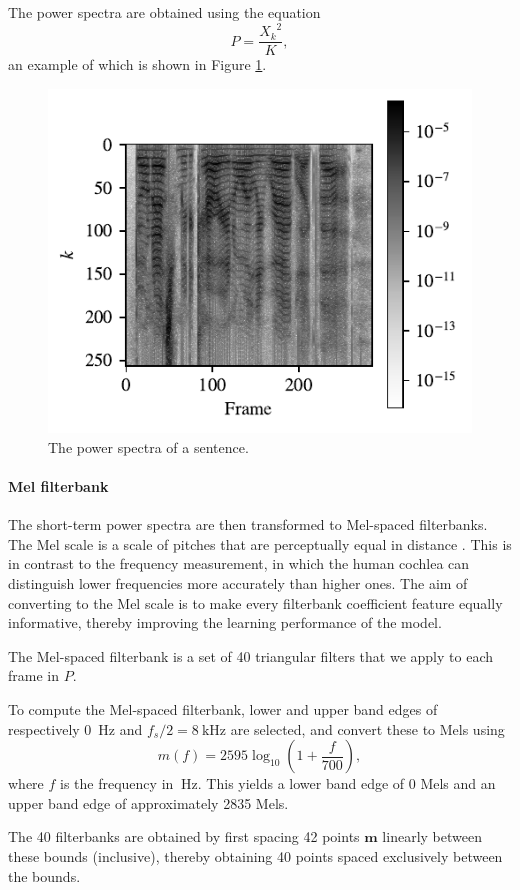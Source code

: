 			The power spectra are obtained using the equation
			\begin{equation}\label{eq:powframes}
				P = \frac{{X_k}^2}{K},
			\end{equation}
			an example of which is shown in Figure \ref{fig:powframes}.

			\begin{figure}[ht]
				\centering
			    \includegraphics[width=0.45\linewidth]{gfx/powframes}
			    \caption[Power spectra]{The power spectra of a sentence.}
			    \label{fig:powframes}
			\end{figure}

		\paragraph{Mel filterbank}

			The short-term power spectra are then transformed to Mel-spaced filterbanks.
			The Mel scale is a scale of pitches that are perceptually equal in distance \citep{stevens1937scale}.
			This is in contrast to the frequency measurement, in which the human cochlea can distinguish lower frequencies more accurately than higher ones.
			The aim of converting to the Mel scale is to make every filterbank coefficient feature equally informative, thereby improving the learning performance of the model.

			The Mel-spaced filterbank is a set of 40 triangular filters that we apply to each frame in $P$.

			To compute the Mel-spaced filterbank, lower and upper band edges of respectively \SI{0}{\Hz} and $f_s/2 = \SI{8}{\kHz}$ are selected, and convert these to Mels using
			\begin{equation}
				m(f) = 2595\log_{10}\left(1 + \frac{f}{700}\right),
			\end{equation}
			where $f$ is the frequency in $\SI{}{\Hz}$.
			This yields a lower band edge of 0 Mels and an upper band edge of approximately 2835 Mels.

			The 40 filterbanks are obtained by first spacing 42 points $\mathbf{m}$ linearly between these bounds (inclusive), thereby obtaining 40 points spaced exclusively between the bounds.

